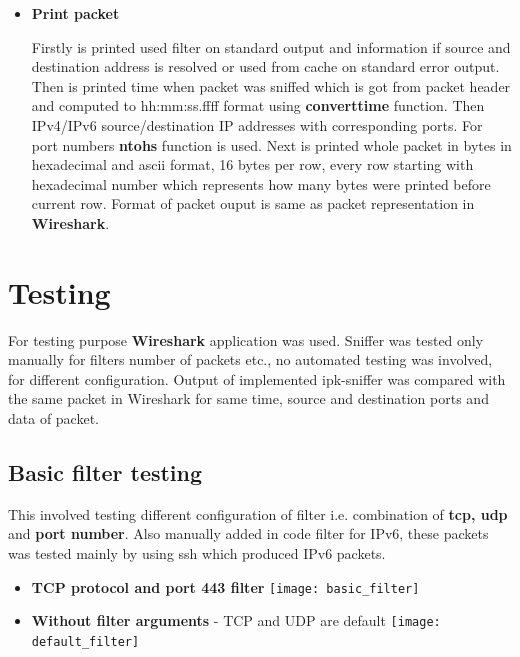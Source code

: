 \documentclass{article}
\begin{document}
\begin{itemize}
	\item \textbf{Print packet} \newline
	
	Firstly is printed used filter on standard output and information if source and destination address is resolved or  used from cache on standard error output. Then is printed time when packet was sniffed which is got from packet header and computed to hh:mm:ss.ffff format using \textbf{convert\textunderscore time} function. Then IPv4/IPv6 source/destination IP addresses with corresponding ports. For port numbers \textbf{ntohs} function is used. Next is printed whole packet in bytes in hexadecimal and ascii format, 16  bytes per row, every row starting with hexadecimal number which represents how many bytes were printed before current row. Format of packet ouput is same as packet representation in \textbf{Wireshark}.

\end{itemize}




\section{Testing}
For testing purpose \textbf{Wireshark} application was used. Sniffer was tested only manually for filters number of packets etc., no automated testing was involved, for different configuration. Output of implemented ipk-sniffer was compared with the same packet in Wireshark for same time, source and destination ports and data of packet.

\subsection{Basic filter testing}
This involved testing different configuration of filter i.e. combination of \textbf{tcp, udp} and \textbf{port number}. Also manually added in code filter for IPv6, these packets was tested mainly by using ssh which produced IPv6 packets.\newline
\begin{itemize}
  \item \textbf{TCP protocol and port 443 filter}\newline
  \texttt{[image: basic\_filter]}
 \item \textbf{Without filter arguments} - TCP and UDP are default\newline
  \texttt{[image: default\_filter]}
\end{itemize}
\end{document}
